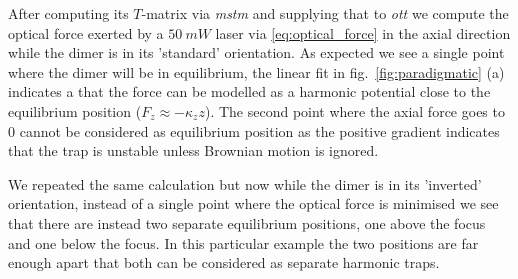 After computing its $T$-matrix via \textit{mstm} and supplying that 
to \textit{ott} we compute the optical force exerted by a $50\ mW$ laser
via \eqref{eq:optical_force} in the axial direction while the dimer is 
in its 'standard' orientation. As expected we see a single point where 
the dimer will be in equilibrium, the linear fit in fig.~\ref{fig:paradigmatic}
(a) indicates a that the force can be modelled as a harmonic potential close 
to the equilibrium position ($F_z\approx-\kappa_z z$). The second point 
where the axial force goes to 0 cannot be considered as equilibrium position 
as the positive gradient indicates that the trap is unstable unless Brownian 
motion is ignored. 

We repeated the same calculation but now while the dimer is in its 'inverted' orientation, instead of a single point where the optical force is minimised we 
see that there are instead two separate equilibrium positions, one above the focus
and one below the focus. In this particular example the two positions are far enough
apart that both can be considered as separate harmonic traps.    
